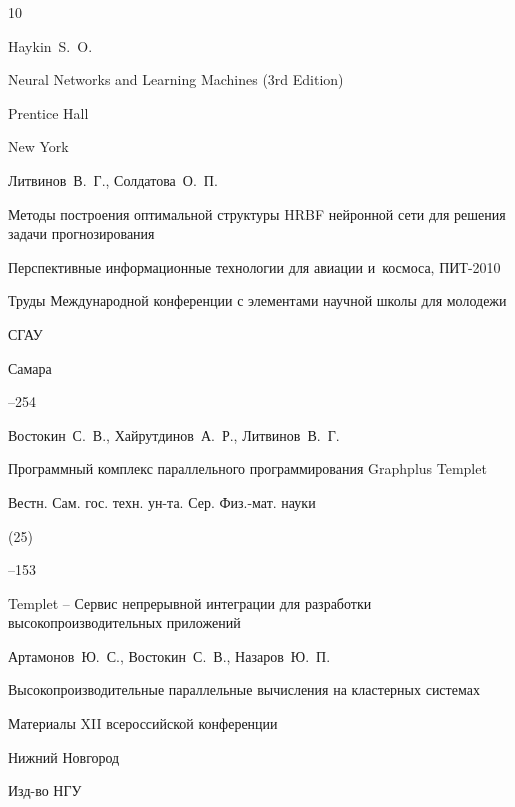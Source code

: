 \begin{thebibliography}{10}

\by Haykin~S.~O.

\book Neural Networks and Learning Machines \rm (3rd Edition)

\publ Prentice Hall


\publ New York 









\by Литвинов~В.~Г., Солдатова~О.~П.

\paper Методы построения оптимальной структуры HRBF нейронной сети для решения задачи прогнозирования

\inbook Перспективные информационные технологии для авиации и~космоса, \rm ПИТ-2010

\bookinfo Труды Международной конференции с элементами научной   школы для молодежи

\publaddr СГАУ

\publ Самара


--254






\by Востокин~С.~В., Хайрутдинов~А.~Р., Литвинов~В.~Г.

\paper Программный комплекс параллельного программирования Graphplus Templet

\jour Вестн. Сам. гос. техн. ун-та. Сер. Физ.-мат. науки


(25)

--153










\paper Templet – Сервис непрерывной интеграции для разработки высокопроизводительных приложений 

\by Артамонов~Ю.~С.,  Востокин~С.~В., Назаров~Ю.~П.

\inbook Высокопроизводительные параллельные вычисления на кластерных системах

\bookinfo Материалы XII всероссийской конференции

\publaddr Нижний Новгород

\publ Изд-во НГУ







\end{thebibliography}





